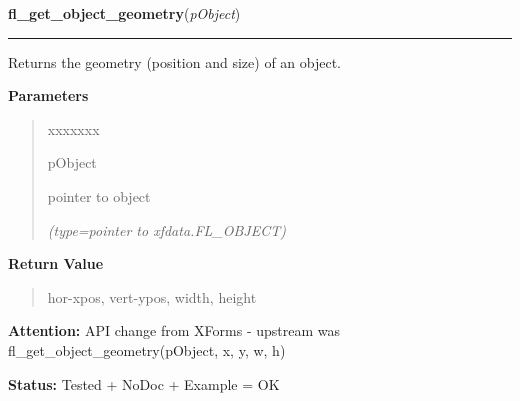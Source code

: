 \hspace{.8\funcindent}\begin{boxedminipage}{\funcwidth}

    \raggedright \textbf{fl\_get\_object\_geometry}(\textit{pObject})

    \vspace{-1.5ex}

    \rule{\textwidth}{0.5\fboxrule}
\setlength{\parskip}{2ex}
    Returns the geometry (position and size) of an object.

\setlength{\parskip}{1ex}
      \textbf{Parameters}
      \vspace{-1ex}

      \begin{quote}
        \begin{Ventry}{xxxxxxx}

          \item[pObject]

          pointer to object

            {\it (type=pointer to xfdata.FL\_OBJECT)}

        \end{Ventry}

      \end{quote}

      \textbf{Return Value}
    \vspace{-1ex}

      \begin{quote}
      hor-xpos, vert-ypos, width, height

      \end{quote}

\textbf{Attention:} API change from XForms - upstream was fl\_get\_object\_geometry(pObject, x,
y, w, h)



\textbf{Status:} Tested + NoDoc + Example = OK



    \end{boxedminipage}

    \label{xformslib:library:fl_get_object_position}

    \vspace{0.5ex}

